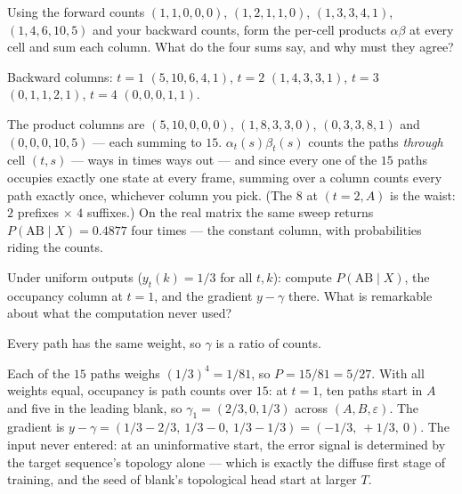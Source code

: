 \begin{problem}
Using the forward counts $(1,1,0,0,0)$, $(1,2,1,1,0)$,
$(1,3,3,4,1)$, $(1,4,6,10,5)$ and your backward counts, form the
per-cell products $\alpha \beta$ at every cell and sum each column.
What do the four sums say, and why must they agree?
\begin{hint}
Backward columns: $t{=}1$ $(5,10,6,4,1)$, $t{=}2$ $(1,4,3,3,1)$,
$t{=}3$ $(0,1,1,2,1)$, $t{=}4$ $(0,0,0,1,1)$.
\end{hint}
\begin{solution}
The product columns are $(5, 10, 0, 0, 0)$, $(1, 8, 3, 3, 0)$,
$(0, 3, 3, 8, 1)$ and $(0, 0, 0, 10, 5)$ — each summing to $15$.
$\alpha_t(s) \beta_t(s)$ counts the paths \emph{through} cell
$(t, s)$ — ways in times ways out — and since every one of the $15$
paths occupies exactly one state at every frame, summing over a
column counts every path exactly once, whichever column you pick.
(The $8$ at $(t{=}2, A)$ is the waist: $2$ prefixes $\times$ $4$
suffixes.) On the real matrix the same sweep returns
$P(\mathrm{AB} \mid X) = 0.4877$ four times — the constant column,
with probabilities riding the counts.
\end{solution}
\end{problem}

\begin{problem}
Under uniform outputs ($y_t(k) = 1/3$ for all $t, k$): compute
$P(\mathrm{AB} \mid X)$, the occupancy column at $t = 1$, and the
gradient $y - \gamma$ there. What is remarkable about what the
computation never used?
\begin{hint}
Every path has the same weight, so $\gamma$ is a ratio of counts.
\end{hint}
\begin{solution}
Each of the $15$ paths weighs $(1/3)^4 = 1/81$, so
$P = 15/81 = 5/27$. With all weights equal, occupancy is path
counts over $15$: at $t = 1$, ten paths start in $A$ and five in the
leading blank, so $\gamma_1 = (2/3, 0, 1/3)$ across
$(A, B, \varepsilon)$. The gradient is
$y - \gamma = (1/3 - 2/3,\ 1/3 - 0,\ 1/3 - 1/3) =
(-1/3,\ +1/3,\ 0)$. The input never entered: at an uninformative
start, the error signal is determined by the target sequence's
topology alone — which is exactly the diffuse first stage of
training, and the seed of blank's topological head start at larger
$T$.
\end{solution}
\end{problem}

